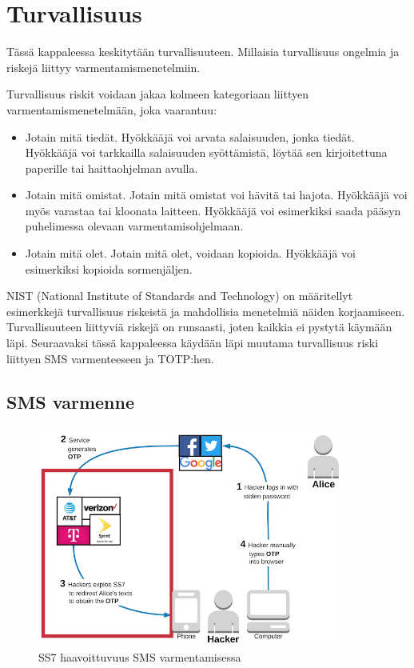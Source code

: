 \chapter{Turvallisuus\label{Turvallisuus}}

Tässä kappaleessa keskitytään turvallisuuteen. Millaisia turvallisuus ongelmia ja riskejä liittyy varmentamismenetelmiin.

Turvallisuus riskit voidaan jakaa kolmeen kategoriaan liittyen varmentamismenetelmään, joka vaarantuu:
\begin{itemize}
    \item Jotain mitä tiedät.
    Hyökkääjä voi arvata salaisuuden, jonka tiedät. Hyökkääjä voi tarkkailla salaisuuden syöttämistä, löytää sen kirjoitettuna paperille tai haittaohjelman avulla.
    \item Jotain mitä omistat.
    Jotain mitä omistat voi hävitä tai hajota. Hyökkääjä voi myös varastaa tai kloonata laitteen. Hyökkääjä voi esimerkiksi saada pääsyn puhelimessa olevaan varmentamisohjelmaan. 
    \item Jotain mitä olet.
    Jotain mitä olet, voidaan kopioida. Hyökkääjä voi esimerkiksi kopioida sormenjäljen.
\end{itemize}
NIST (National Institute of Standards and Technology) on määritellyt esimerkkejä turvallisuus riskeistä ja mahdollisia menetelmiä näiden korjaamiseen. Turvallisuuteen liittyviä riskejä on runsaasti, joten kaikkia ei pystytä käymään läpi. Seuraavaksi tässä kappaleessa käydään läpi muutama turvallisuus riski liittyen SMS varmenteeseen ja TOTP:hen. \citep{NIST_800_63B}


\section{SMS varmenne}
\begin{figure}[ht]
    \centering
    \includegraphics[width=10cm]{template/figures/SS7 attack vulnerable.png}
    \caption{SS7 haavoittuvuus SMS varmentamisessa \citep{2FA_SMS}}
    \label{fig:ss7SMSM}
\end{figure}

